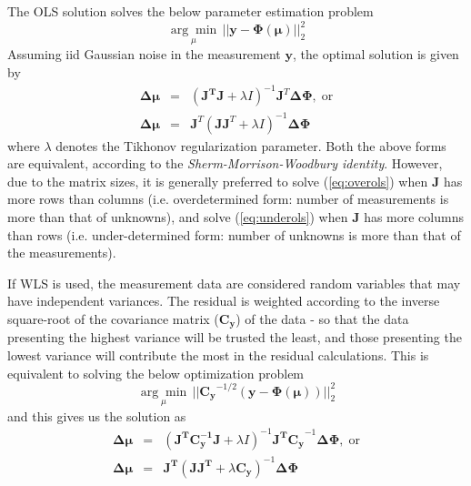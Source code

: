\documentclass{article}
\begin{document}
The OLS solution solves the below parameter estimation problem
\begin{equation}
\underset{\mu}{\arg\min} \, || \mathbf{y-\Phi(\mu)} ||^2_2
\end{equation}
Assuming iid Gaussian noise in the measurement $\mathbf y$, the optimal solution is given by
\begin{eqnarray}
\mathbf{\Delta\mu}&=&(\mathbf{J^TJ}+\lambda I)^{-1}\mathbf{J}^T\mathbf{\Delta\Phi},\;\mathrm{or}\label{eq:overols}\\
\mathbf{\Delta\mu}&=&\mathbf{J}^T(\mathbf{JJ}^T+\lambda I)^{-1}\mathbf{\Delta\Phi}\label{eq:underols}
\end{eqnarray}
where $\lambda$ denotes the Tikhonov regularization parameter. Both the above forms are equivalent, according to the \emph{Sherm-Morrison-Woodbury
identity}. However, due to the matrix sizes, it is generally preferred to solve (\ref{eq:overols}) when $\mathbf{J}$ has more rows than columns (i.e. overdetermined form: number of measurements is more than that of unknowns), and solve (\ref{eq:underols}) when $\mathbf{J}$ has more columns than rows (i.e. under-determined form: number of unknowns is more than that of the measurements).

If WLS is used, the measurement data are considered random variables that may have independent variances. The residual is weighted according to the inverse square-root of the covariance matrix ($\mathbf{C_y}$) of the data - so that the data presenting the highest variance will be trusted the least, and those presenting the lowest variance will contribute the most in the residual calculations. This is equivalent to solving the below optimization problem
\begin{equation}
\underset{\mu}{\arg\min} \, || \mathbf{C_y}^{-1/2}\left(\boldsymbol{y-\Phi(\mu)}\right) ||^2_2
\end{equation}
and this gives us the solution as
\begin{eqnarray}
\mathbf{\Delta\mu}&=&(\mathbf{J^TC_y^{-1}J}+\lambda I)^{-1}\mathbf{J^TC_y}^{-1}\mathbf{\Delta\Phi},\;\mathrm{or}\label{eq:overwls}\\
\mathbf{\Delta\mu}&=&\mathbf{J^T}(\mathbf{JJ^T}+\lambda \mathbf{C_y})^{-1}\mathbf{\Delta\Phi}\label{eq:underwls}
\end{eqnarray}
\end{document}
